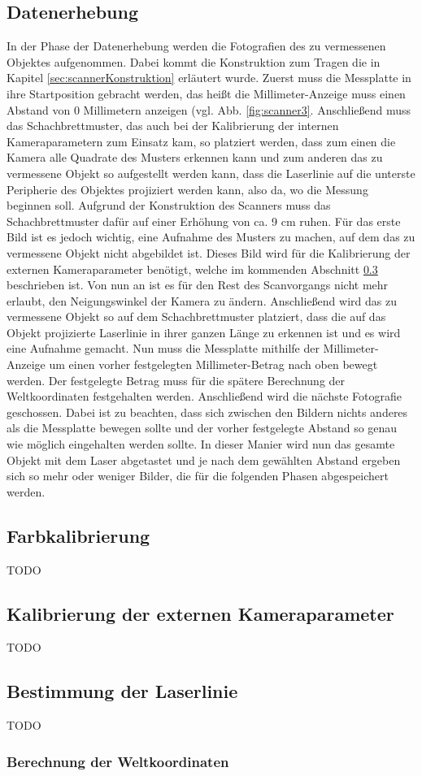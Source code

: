 \subsection{Datenerhebung}
In der Phase der Datenerhebung werden die Fotografien des zu vermessenen Objektes aufgenommen. Dabei kommt die Konstruktion zum Tragen die in Kapitel \ref{sec:scannerKonstruktion} erläutert wurde. Zuerst muss die Messplatte in ihre Startposition gebracht werden, das heißt die Millimeter-Anzeige muss einen Abstand von 0 Millimetern anzeigen (vgl. Abb. \ref{fig:scanner3}. Anschließend muss das Schachbrettmuster, das auch bei der Kalibrierung der internen Kameraparametern zum Einsatz kam, so platziert werden, dass zum einen die Kamera alle Quadrate des Musters erkennen kann und zum anderen das zu vermessene Objekt so aufgestellt werden kann, dass die Laserlinie auf die unterste Peripherie des Objektes projiziert werden kann, also da, wo die Messung beginnen soll. Aufgrund der Konstruktion des Scanners muss das Schachbrettmuster dafür auf einer Erhöhung von ca. 9 cm ruhen. Für das erste Bild ist es jedoch wichtig, eine Aufnahme des Musters zu machen, auf dem das zu vermessene Objekt nicht abgebildet ist. Dieses Bild wird für die Kalibrierung der externen Kameraparameter benötigt, welche im kommenden Abschnitt \ref{subsec:externeKalibrierung} beschrieben ist. Von nun an ist es für den Rest des Scanvorgangs nicht mehr erlaubt, den Neigungswinkel der Kamera zu ändern.
Anschließend wird das zu vermessene Objekt so auf dem Schachbrettmuster platziert, dass die auf das Objekt projizierte Laserlinie in ihrer ganzen Länge zu erkennen ist und es wird eine Aufnahme gemacht. Nun muss die Messplatte mithilfe der Millimeter-Anzeige um einen vorher festgelegten Millimeter-Betrag nach oben bewegt werden. Der festgelegte Betrag muss für die spätere Berechnung der Weltkoordinaten festgehalten werden. Anschließend wird die nächste Fotografie geschossen. Dabei ist zu beachten, dass sich zwischen den Bildern nichts anderes als die Messplatte bewegen sollte und der vorher festgelegte Abstand so genau wie möglich eingehalten werden sollte. In dieser Manier wird nun das gesamte Objekt mit dem Laser abgetastet und je nach dem gewählten Abstand ergeben sich so mehr oder weniger Bilder, die für die folgenden Phasen abgespeichert werden.      

\subsection{Farbkalibrierung}
TODO

\subsection{Kalibrierung der externen Kameraparameter}
\label{subsec:externeKalibrierung}
TODO

\subsection{Bestimmung der Laserlinie}
TODO

\subsubsection{Berechnung der Weltkoordinaten}